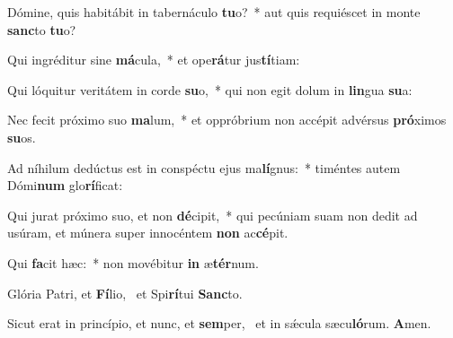 \item Dómine, quis habitábit in tabernáculo \textbf{tu}o?~* aut quis requiéscet in monte \textbf{sanc}to \textbf{tu}o?
\item Qui ingréditur sine \textbf{má}cula,~* et ope\textbf{rá}tur jus\textbf{tí}tiam:
\item Qui lóquitur veritátem in corde \textbf{su}o,~* qui non egit dolum in \textbf{lin}gua \textbf{su}a:
\item Nec fecit próximo suo \textbf{ma}lum,~* et oppróbrium non accépit advérsus \textbf{pró}ximos \textbf{su}os.
\item Ad níhilum dedúctus est in conspéctu ejus ma\textbf{lí}gnus:~* timéntes autem Dómi\textbf{num} glo\textbf{rí}ficat:
\item Qui jurat próximo suo, et non \textbf{dé}cipit,~* qui pecúniam suam non dedit ad usúram, et múnera super innocéntem \textbf{non} ac\textbf{cé}pit.
\item Qui \textbf{fa}cit hæc:~* non movébitur \textbf{in} æ\textbf{tér}num.
\item Glória Patri, et \textbf{Fí}lio,~\psstar{} et Spi\textbf{rí}tui \textbf{Sanc}to.
\item Sicut erat in princípio, et nunc, et \textbf{sem}per,~\psstar{} et in sǽcula sæcu\textbf{ló}rum. \textbf{A}men.
